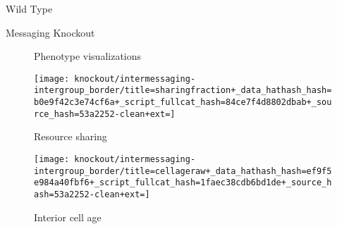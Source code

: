 \begin{figure*}[!htbp]
\begin{center}
\begin{minipage}[t]{\columnwidth}
\vspace{1.0ex}

\hspace*{\fill}%
\begin{minipage}[t]{0.05\columnwidth}
\vspace{0pt} %
\end{minipage}%
\hfill
\begin{minipage}[t]{0.45\columnwidth}
\centering
\vspace{0pt} %
Wild Type
\end{minipage}%
\hfill
\begin{minipage}[t]{0.45\columnwidth}
\centering
\vspace{0pt} %
Messaging Knockout
\end{minipage}%
\hspace*{\fill}

\vspace{1.0ex}

\begin{subfigure}{\columnwidth}
  \caption{Phenotype visualizations}
  \label{fig:intermessaging-intergroup_border-phen}
\end{subfigure}

\begin{minipage}[t]{0.8\columnwidth}
\centering
\vspace{0pt} %
\begin{subfigure}[b]{\textwidth}
\texttt{[image: knockout/intermessaging-intergroup\_border/title=sharingfraction+\_data\_hathash\_hash=b0e9f42c3e74cf6a+\_script\_fullcat\_hash=84ce7f4d8802dbab+\_source\_hash=53a2252-clean+ext=]}%
\caption{Resource sharing}
\label{fig:intermessaging-intergroup_border-sharing}
\end{subfigure}
\end{minipage}%

\vspace{1ex}

\hspace*{\fill}%
\begin{minipage}[t]{0.8\columnwidth}
\centering
\vspace{0pt} %
\begin{subfigure}[b]{\textwidth}
\texttt{[image: knockout/intermessaging-intergroup\_border/title=cellageraw+\_data\_hathash\_hash=ef9f5e984a40fbf6+\_script\_fullcat\_hash=1faec38cdb6bd1de+\_source\_hash=53a2252-clean+ext=]}%
\caption{Interior cell age}
\label{fig:intermessaging-intergroup_border-cellage}
\end{subfigure}
\end{minipage}%
\hspace*{\fill}


\end{minipage}
\end{center}
\end{figure*}
